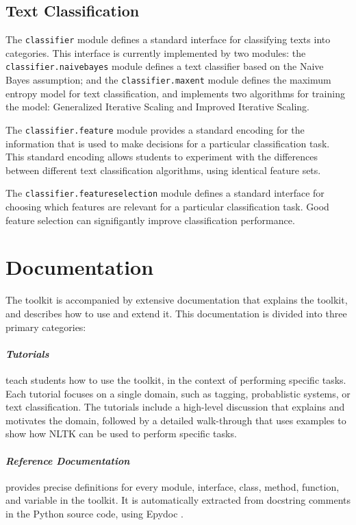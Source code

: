 \documentclass[11pt]{article}
\begin{document}
\subsection*{Text Classification}

The \texttt{classifier} module defines a standard interface for
classifying texts into categories.  This interface is currently
implemented by two modules: the \texttt{classifier.naivebayes} module
defines a text classifier based on the Naive Bayes assumption; and the
\texttt{classifier.maxent} module defines the maximum entropy model
for text classification, and implements two algorithms for training
the model: Generalized Iterative Scaling and Improved Iterative
Scaling.

The \texttt{classifier.feature} module provides a standard encoding
for the information that is used to make decisions for a particular
classification task.  This standard encoding allows students to
experiment with the differences between different text classification
algorithms, using identical feature sets.

The \texttt{classifier.featureselection} module defines a standard
interface for choosing which features are relevant for a particular
classification task.  Good feature selection can signifigantly improve
classification performance.

\section{Documentation}
\label{sec:documentation}

The toolkit is accompanied by extensive documentation that explains
the toolkit, and describes how to use and extend it.  This
documentation is divided into three primary categories:

\paragraph{\textit{Tutorials}} teach students how to use the toolkit,
in the context of performing specific tasks.  Each tutorial focuses on
a single domain, such as tagging, probablistic systems, or text
classification.  The tutorials include a high-level discussion that
explains and motivates the domain, followed by a detailed
walk-through that uses examples to show how NLTK can be used to
perform specific tasks.

\paragraph{\textit{Reference Documentation}} provides precise
definitions for every module, interface, class, method, function, and
variable in the toolkit.  It is automatically extracted from docstring
comments in the Python source code, using Epydoc \cite{epydoc}.
\end{document}

